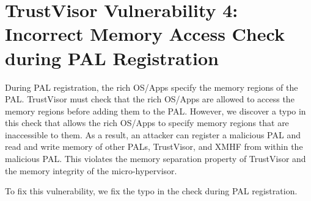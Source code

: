 \section{TrustVisor Vulnerability 4: Incorrect Memory Access Check during PAL Registration}
\label{sec:vuln_xmhf_tv_ept_check}

During PAL registration, the rich OS/Apps specify the memory regions of the PAL. TrustVisor must check that the rich OS/Apps are allowed to access the memory regions before adding them to the PAL. However, we discover a typo in this check that allows the rich OS/Apps to specify memory regions that are inaccessible to them. As a result, an attacker can register a malicious PAL and read and write memory of other PALs, TrustVisor, and XMHF from within the malicious PAL. This violates the memory separation property of TrustVisor and the memory integrity of the micro-hypervisor.

To fix this vulnerability, we fix the typo in the check during PAL registration.

